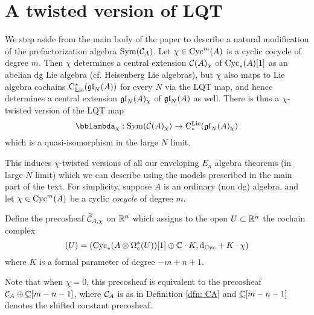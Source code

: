 \documentclass[11pt]{amsart}
\numberwithin{equation}{section}
\def\brian{\textcolor{blue}{BW: }\textcolor{blue}}
\begin{document}
\section{A twisted version of LQT}

We step aside from the main body of the paper to describe a natural modification of the prefactorization algebra ${\rm Sym}(\mathcal C_A)$. 
Let $\chi \in {\rm Cyc}^m(A)$ is a cyclic cocycle of degree $m$. 
Then $\chi$ determines a central extension $\mathcal C(A)_\chi$ of ${\rm Cyc}_*(A)[1]$ as an abelian dg Lie algebra (cf. Heisenberg Lie algebras),
but $\chi$ also maps to Lie algebra cochains ${\rm C}_{\rm Lie}^*(\frak{gl}_N(A))$ for every $N$ via the LQT map,
and hence determines a central extension $\frak{gl}_N(A)_\chi$ of $\frak{gl}_N(A)$ as well.
There is thus a $\chi$-twisted version of the LQT map
\[
\lqt_\chi: \Sym(\cC(A)_\chi) \to \cliels(\gl_N(A)_\chi)
\]
which is a quasi-isomorphism in the large $N$ limit.

This induces $\chi$-twisted versions of all our enveloping $E_n$ algebra theorems (in large $N$ limit) which we can describe using the models prescribed in the main part of the text. 
For simplicity, suppose $A$ is an ordinary (non dg) algebra, and let $\chi \in {\rm Cyc}^m(A)$ be a cyclic {\em cocycle} of degree $m$.

\begin{dfn}
Define the precosheaf $\widetilde{\mathcal C}_{A,\chi}$ on $\mathbb R^n$ which assigns to the open $U \subset \mathbb R^n$ the cochain complex
\[
 (U) = \left({\rm Cyc}_*(A \otimes \Omega^*_c(U))[1] \oplus \mathbb C \cdot K , {\rm d}_{\rm Cyc} + K \cdot \chi \right) 
\]
where $K$ is a formal parameter of degree $-m+n+1$.
\end{dfn}

Note that when $\chi = 0$, this precosheaf is equivalent to the precosheaf $\mathcal C_A \oplus \underline{\mathbb C}[m-n-1]$, where $\mathcal C_A$ is as in Definition \ref{dfn: CA} and $\underline{\mathbb C}[m-n-1]$ denotes the shifted constant precosheaf. 

%



  


%  
\end{document}
